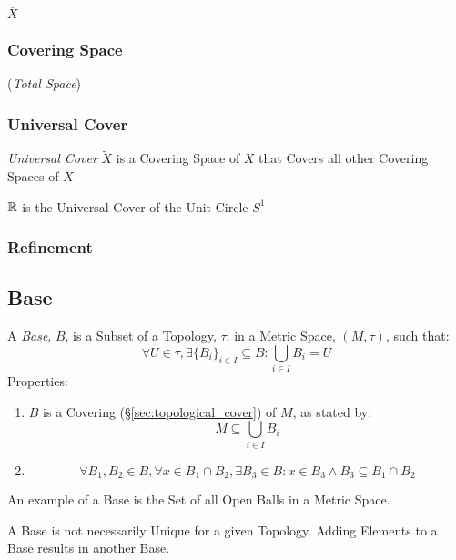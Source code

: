 $\overline{X}$


\subsubsection{Covering Space}\label{sec:covering_space}

(\emph{Total Space})



\subsubsection{Universal Cover}\label{sec:universal_cover}\hfill

\emph{Universal Cover} $\tilde{X}$ is a Covering Space of $X$ that
Covers all other Covering Spaces of $X$

$\mathbb{R}$ is the Universal Cover of the Unit Circle $S^1$




\subsubsection{Refinement}\label{sec:refinement}



\subsection{Base}\label{sec:topological_base}

A \emph{Base}, $B$, is a Subset of a Topology, $\tau$, in a Metric
Space, $(M,\tau)$, such that:
\[
  \forall U \in \tau, \exists \{B_i\}_{i \in I} \subseteq B :
  \bigcup_{i \in I}B_i = U
\]
Properties:
\begin{enumerate}
  \item $B$ is a Covering (\S\ref{sec:topological_cover}) of $M$, as
    stated by:
\[
  M \subseteq \bigcup_{i \in I} B_i
\]

  \item
\[
  \forall B_1, B_2 \in B, \forall x \in B_1 \cap B_2,
  \exists B_3 \in B : x \in B_3 \wedge B_3 \subseteq B_1 \cap B_2
\]

\end{enumerate}
An example of a Base is the Set of all Open Balls in a Metric Space.

A Base is not necessarily Unique for a given Topology. Adding Elements
to a Base results in another Base.



